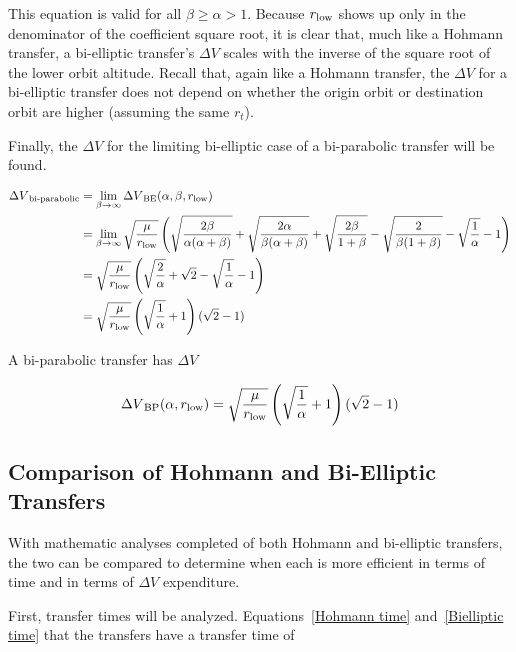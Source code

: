 \documentclass[../basicOrbitalDynamics.tex]{subfiles}
\begin{document}
This equation is valid for all $\beta\geq\alpha>1$. Because ${r}_\text{low}$ shows up only in the denominator of the coefficient square root, it is clear that, much like a Hohmann transfer, a bi-elliptic transfer's $\Delta V$ scales with the inverse of the square root of the lower orbit altitude. Recall that, again like a Hohmann transfer, the $\Delta V$ for a bi-elliptic transfer does not depend on whether the origin orbit or destination orbit are higher (assuming the same $r_t$).

Finally, the $\Delta V$ for the limiting bi-elliptic case of a bi-parabolic transfer will be found.

\begin{align*}
    {\Delta V}_\text{bi-parabolic} &= \lim_{\beta\rightarrow\infty}{\Delta V}_\text{BE}(\alpha,\beta,{r}_\text{low})\\
    &= \lim_{\beta\rightarrow\infty}\sqrt{\frac{\mu}{{r}_\text{low}}}\left(\sqrt{\frac{2\beta}{\alpha(\alpha+\beta)}}+\sqrt{\frac{2\alpha}{\beta(\alpha+\beta)}}+\sqrt{\frac{2\beta}{1+\beta}}-\sqrt{\frac{2}{\beta(1+\beta)}}-\sqrt{\frac{1}{\alpha}}-1\right)\\
    &=\sqrt{\frac{\mu}{{r}_\text{low}}}\left(\sqrt{\frac{2}{\alpha}}+\sqrt{2}-\sqrt{\frac{1}{\alpha}}-1\right)\\
    &=\sqrt{\frac{\mu}{{r}_\text{low}}}\left(\sqrt{\frac{1}{\alpha}}+1\right)(\sqrt{2}-1)\\
\end{align*}

A bi-parabolic transfer has $\Delta V$

\begin{equation}\label{bi-parabolic Delta V}
    {\Delta V}_\text{BP}(\alpha,{r}_\text{low}) =\sqrt{\frac{\mu}{{r}_\text{low}}}\left(\sqrt{\frac{1}{\alpha}}+1\right)(\sqrt{2}-1)
\end{equation}

\subsection{Comparison of Hohmann and Bi-Elliptic Transfers}\label{sec:Comparison of hohmann and bielliptic transfers}

With mathematic analyses completed of both Hohmann and bi-elliptic transfers, the two can be compared to determine when each is more efficient in terms of time and in terms of $\Delta V$ expenditure.

First, transfer times will be analyzed. Equations~\eqref{Hohmann time} and~\eqref{Bielliptic time} that the transfers have a transfer time of
\end{document}
